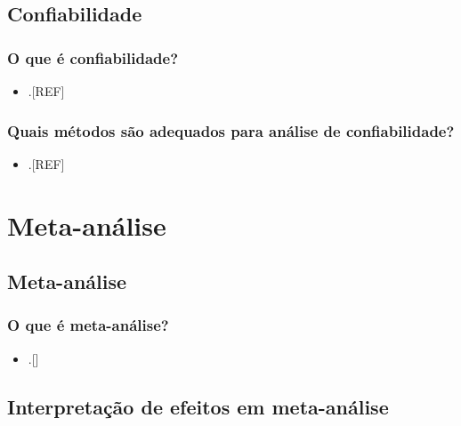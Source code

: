 \documentclass[
  a4paper,
]{book}
\providecommand{\tightlist}{%
  \setlength{\itemsep}{0pt}\setlength{\parskip}{0pt}}
\begin{document}
\hypertarget{confiabilidade}{%
\section{Confiabilidade}\label{confiabilidade}}

\hypertarget{o-que-uxe9-confiabilidade}{%
\subsection{O que é confiabilidade?}\label{o-que-uxe9-confiabilidade}}

\begin{itemize}
\tightlist
\item
  .{[}REF{]}
\end{itemize}

\hypertarget{quais-muxe9todos-suxe3o-adequados-para-anuxe1lise-de-confiabilidade}{%
\subsection{Quais métodos são adequados para análise de confiabilidade?}\label{quais-muxe9todos-suxe3o-adequados-para-anuxe1lise-de-confiabilidade}}

\begin{itemize}
\tightlist
\item
  .{[}REF{]}
\end{itemize}

\hypertarget{meta-analise}{%
\chapter{\texorpdfstring{\textbf{Meta-análise}}{Meta-análise}}\label{meta-analise}}

\hypertarget{meta-analise}{%
\section{Meta-análise}\label{meta-analise}}

\hypertarget{o-que-uxe9-meta-anuxe1lise}{%
\subsection{O que é meta-análise?}\label{o-que-uxe9-meta-anuxe1lise}}

\begin{itemize}
\tightlist
\item
  .{[}{]}
\end{itemize}

\hypertarget{interpretacao}{%
\section{Interpretação de efeitos em meta-análise}\label{interpretacao}}
\end{document}
